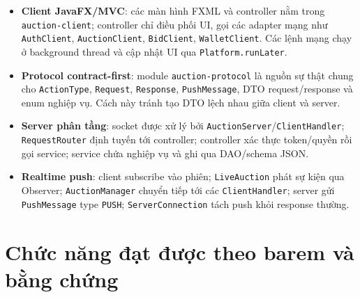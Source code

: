 \documentclass[10pt,a4paper]{article}
\begin{document}
\begin{itemize}
    \item \textbf{Client JavaFX/MVC}: các màn hình FXML và controller nằm trong \texttt{auction-client}; controller chỉ điều phối UI, gọi các adapter mạng như \texttt{AuthClient}, \texttt{AuctionClient}, \texttt{BidClient}, \texttt{WalletClient}. Các lệnh mạng chạy ở background thread và cập nhật UI qua \texttt{Platform.runLater}.
    \item \textbf{Protocol contract-first}: module \texttt{auction-protocol} là nguồn sự thật chung cho \texttt{ActionType}, \texttt{Request}, \texttt{Response}, \texttt{PushMessage}, DTO request/response và enum nghiệp vụ. Cách này tránh tạo DTO lệch nhau giữa client và server.
    \item \textbf{Server phân tầng}: socket được xử lý bởi \texttt{AuctionServer}/\texttt{ClientHandler}; \texttt{RequestRouter} định tuyến tới controller; controller xác thực token/quyền rồi gọi service; service chứa nghiệp vụ và ghi qua DAO/schema JSON.
    \item \textbf{Realtime push}: client subscribe vào phiên; \texttt{LiveAuction} phát sự kiện qua Observer; \texttt{AuctionManager} chuyển tiếp tới các \texttt{ClientHandler}; server gửi \texttt{PushMessage} type \texttt{PUSH}; \texttt{ServerConnection} tách push khỏi response thường.
\end{itemize}

\section{Chức năng đạt được theo barem và bằng chứng}
\end{document}
